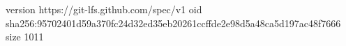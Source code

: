 version https://git-lfs.github.com/spec/v1
oid sha256:95702401d59a370fc24d32ed35eb20261ccffde2e98d5a48ca5d197ac48f7666
size 1011
